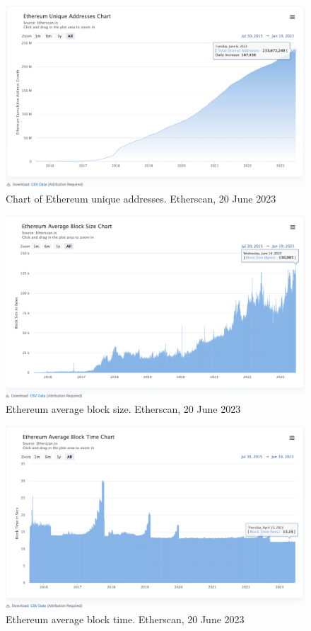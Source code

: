 \documentclass[UTF8]{article}
\begin{document}
\begin{figure}[htbp]
\begin{center}
\includegraphics[width=0.9\linewidth]{images/ethuniqueaddr}
\caption{Chart of Ethereum unique addresses. Etherscan, 20 June 2023}
\label{fig:ethuniqueaddr}
\end{center}
\end{figure}

\begin{figure}[htbp]
\begin{center}
\includegraphics[width=0.9\linewidth]{images/ethavgblk}
\caption{Ethereum average block size. Etherscan, 20 June 2023}
\label{fig:ethavgblk}
\end{center}
\end{figure}

\begin{figure}[htbp]
\begin{center}
\includegraphics[width=0.9\linewidth]{images/ethavgtime}
\caption{Ethereum average block time. Etherscan, 20 June 2023}
\label{fig:ethavgtime}
\end{center}
\end{figure}
\end{document}
